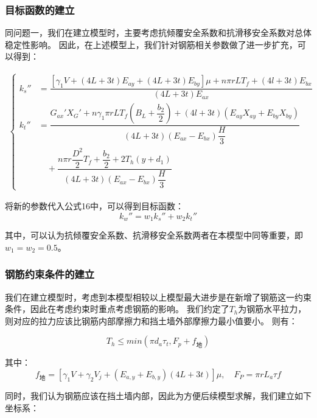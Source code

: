 \documentclass[withoutpreface,bwprint]{cumcmthesis}
\begin{document}
\subsubsection{目标函数的建立}
同问题一，我们在建立模型时，主要考虑抗倾覆安全系数和抗滑移安全系数对总体稳定性影响。
因此，在上述模型上，我们针对钢筋相关参数做了进一步扩充，可以得到：

    \begin{equation}
        \begin{aligned}
            \begin{cases}
                k_s'' &= \dfrac{[\gamma_1 V + (4L + 3t)E_{ay} + (4L + 3t)E_{by}]\mu + n\pi r L T_f + (4l + 3t)E_{bx}}{(4L + 3t)E_{ax}} \\
                k_t'' &= \dfrac{G_{ax}' X_G' + n\gamma_1 \pi r L T_f \left(B_L + \dfrac{b_2}{2}\right) + (4l + 3t)\left(E_{ay}X_{ay} + E_{by}X_{by}\right)}{(4L + 3t)\left(E_{ax} - E_{bx}\right)\dfrac{H}{3}} \\
                & \quad + \dfrac{n\pi r \dfrac{D^2}{2}T_f + \dfrac{b_2}{2} + 2T_h(y + d_1)}{(4L + 3t)\left(E_{ax} - E_{bx}\right)\dfrac{H}{3}}
            \end{cases}
            \end{aligned}
        \label{eq:stability}
    \end{equation}

将新的参数代入公式16中，可以得到目标函数：
    \begin{equation}
        k_w''=w_1k_s''+w_2k_t''
    \end{equation}
    \par
其中，可以认为抗倾覆安全系数、抗滑移安全系数两者在本模型中同等重要，即$w_1=w_2=0.5$。

\subsubsection{钢筋约束条件的建立}
我们在建立模型时，考虑到本模型相较以上模型最大进步是在新增了钢筋这一约束条件，因此在考虑约束时重点考虑钢筋的影响。
我们约定了$T_h$为钢筋水平拉力，则对应的拉力应该比钢筋内部摩擦力和挡土墙外部摩擦力最小值要小。
则有：

\begin{equation}
    T_h\le min(\pi d_a\tau _t,F_p+f_\text{地} )
\end{equation}
\par
其中：
$$f_\text{地}=[\gamma _1V+\gamma _2V_j+(E_{a,y}+ E_{b,y})(4L+3t)]\mu ,\quad F_P=\pi rL_a\tau f$$


同时，我们认为钢筋应该在挡土墙内部，因此为方便后续模型求解，我们建立如下坐标系：
\end{document}
